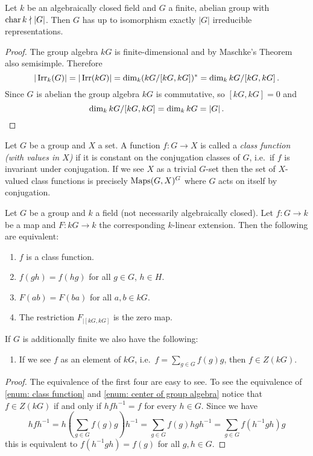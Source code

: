 \begin{cor}\label{cor: number of irreducible representations of finite abelian group}
  Let $k$ be an algebraically closed field and $G$ a finite, abelian group with $\operatorname{char} k \nmid |G|$.
  Then $G$ has up to isomorphism exactly $|G|$ irreducible representations.
\end{cor}
\begin{proof}
  The group algebra $kG$ is finite-dimensional and by Maschke’s Theorem also semisimple.
  Therefore
  \[
      |\operatorname{Irr}_k(G)|
    = |\operatorname{Irr}(kG)|
    = \dim_k (kG/[kG, kG])^*
    = \dim_k kG/[kG, kG] \,.
  \]
  Since $G$ is abelian the group algebra $kG$ is commutative, so $[kG,kG] = 0$ and
  \[
      \dim_k kG/[kG, kG]
    = \dim_k kG
    = |G| \,.
    \qedhere
  \]
\end{proof}


\begin{defi}
  Let $G$ be a group and $X$ a set.
  A function $f \colon G \to X$ is called a \emph{class function (with values in $X$)} if it is constant on the conjugation classes of $G$, i.e.\ if $f$ is invariant under conjugation.
  If we see $X$ as a trivial $G$-set then the set of $X$-valued class functions is precisely $\operatorname{Maps}(G,X)^G$ where $G$ acts on itself by conjugation.
\end{defi}


\begin{lem} \label{lem: characterisation class functions}
  Let $G$ be a group and $k$ a field (not necessarily algebraically closed).
  Let $f \colon G \to k$ be a map and $F \colon kG \to k$ the corresponding $k$-linear extension.
  Then the following are equivalent:
  \begin{enumerate}[label=\emph{\roman*)}, leftmargin=*]
    \item \label{enum: class function}
      $f$ is a class function.
    \item
      $f(gh) = f(hg)$ for all $g \in G$, $h \in H$.
    \item
      $F(ab) = F(ba)$ for all $a, b \in kG$.
    \item
      The restriction $F_{|[kG,kG]}$ is the zero map.
  \end{enumerate}
  If $G$ is additionally finite we also have the following:
  \begin{enumerate}[label=\emph{\roman*)}, leftmargin=*, resume]
    \item \label{enum: center of group algebra}
      If we see $f$ as an element of $kG$, i.e.\ $f = \sum_{g \in G} f(g) g$, then $f \in Z(kG)$.
  \end{enumerate}
\end{lem}
\begin{proof}
  The equivalence of the first four are easy to see.
  To see the equivalence of \ref{enum: class function} and \ref{enum: center of group algebra} notice that $f \in Z(kG)$ if and only if $hfh^{-1} = f$ for every $h \in G$.
  Since we have
    \[
        h f h^{-1}
      = h\left( \sum_{g \in G} f(g) g \right) h^{-1}
      = \sum_{g \in G} f(g) hgh^{-1}
      = \sum_{g \in G} f(h^{-1} g h) g
    \]
    this is equivalent to $f(h^{-1} g h) = f(g)$ for all $g, h \in G$.
\end{proof}


